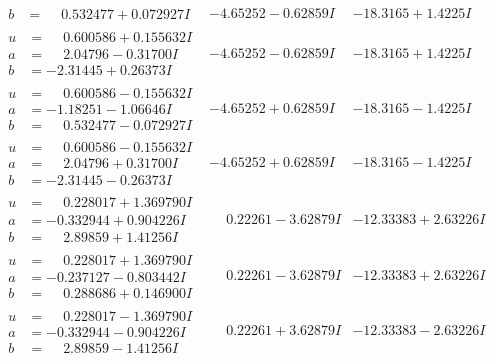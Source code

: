 \documentclass[1p]{elsarticle_modified}
\theoremstyle{definition}
\begin{document}
$$\begin{array}{c|c|c}
\begin{aligned}
b &= \phantom{-}0.532477 + 0.072927 I\end{aligned}
 & -4.65252 - 0.62859 I & -18.3165 + 1.4225 I \\ \hline\begin{aligned}
u &= \phantom{-}0.600586 + 0.155632 I \\
a &= \phantom{-}2.04796 - 0.31700 I \\
b &= -2.31445 + 0.26373 I\end{aligned}
 & -4.65252 - 0.62859 I & -18.3165 + 1.4225 I \\ \hline\begin{aligned}
u &= \phantom{-}0.600586 - 0.155632 I \\
a &= -1.18251 - 1.06646 I \\
b &= \phantom{-}0.532477 - 0.072927 I\end{aligned}
 & -4.65252 + 0.62859 I & -18.3165 - 1.4225 I \\ \hline\begin{aligned}
u &= \phantom{-}0.600586 - 0.155632 I \\
a &= \phantom{-}2.04796 + 0.31700 I \\
b &= -2.31445 - 0.26373 I\end{aligned}
 & -4.65252 + 0.62859 I & -18.3165 - 1.4225 I \\ \hline\begin{aligned}
u &= \phantom{-}0.228017 + 1.369790 I \\
a &= -0.332944 + 0.904226 I \\
b &= \phantom{-}2.89859 + 1.41256 I\end{aligned}
 & \phantom{-}0.22261 - 3.62879 I & -12.33383 + 2.63226 I \\ \hline\begin{aligned}
u &= \phantom{-}0.228017 + 1.369790 I \\
a &= -0.237127 - 0.803442 I \\
b &= \phantom{-}0.288686 + 0.146900 I\end{aligned}
 & \phantom{-}0.22261 - 3.62879 I & -12.33383 + 2.63226 I \\ \hline\begin{aligned}
u &= \phantom{-}0.228017 - 1.369790 I \\
a &= -0.332944 - 0.904226 I \\
b &= \phantom{-}2.89859 - 1.41256 I\end{aligned}
 & \phantom{-}0.22261 + 3.62879 I & -12.33383 - 2.63226 I \\ \hline\begin{aligned}

\end{aligned}
\end{array}$$
\end{document}
